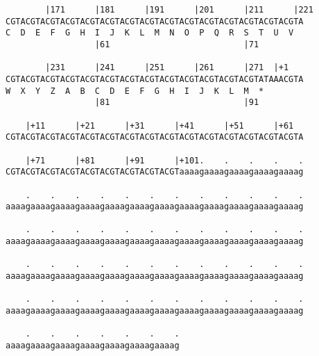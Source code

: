 \documentclass{article}
\begin{document}
\begin{Verbatim}
        |171      |181      |191      |201      |211      |221
CGTACGTACGTACGTACGTACGTACGTACGTACGTACGTACGTACGTACGTACGTACGTA
C  D  E  F  G  H  I  J  K  L  M  N  O  P  Q  R  S  T  U  V  
                  |61                           |71         
  
        |231      |241      |251      |261      |271  |+1   
CGTACGTACGTACGTACGTACGTACGTACGTACGTACGTACGTACGTACGTATAAACGTA
W  X  Y  Z  A  B  C  D  E  F  G  H  I  J  K  L  M  *   
                  |81                           |91         
  
    |+11      |+21      |+31      |+41      |+51      |+61  
CGTACGTACGTACGTACGTACGTACGTACGTACGTACGTACGTACGTACGTACGTACGTA
                                                            
    |+71      |+81      |+91      |+101.    .    .    .    .
CGTACGTACGTACGTACGTACGTACGTACGTACGTaaaagaaaagaaaagaaaagaaaag
                                                            
    .    .    .    .    .    .    .    .    .    .    .    .
aaaagaaaagaaaagaaaagaaaagaaaagaaaagaaaagaaaagaaaagaaaagaaaag
                                                            
    .    .    .    .    .    .    .    .    .    .    .    .
aaaagaaaagaaaagaaaagaaaagaaaagaaaagaaaagaaaagaaaagaaaagaaaag
                                                            
    .    .    .    .    .    .    .    .    .    .    .    .
aaaagaaaagaaaagaaaagaaaagaaaagaaaagaaaagaaaagaaaagaaaagaaaag
                                                            
    .    .    .    .    .    .    .    .    .    .    .    .
aaaagaaaagaaaagaaaagaaaagaaaagaaaagaaaagaaaagaaaagaaaagaaaag
                                                            
    .    .    .    .    .    .    . 
aaaagaaaagaaaagaaaagaaaagaaaagaaaag

                                   
                                    
\end{Verbatim}
\end{document}
